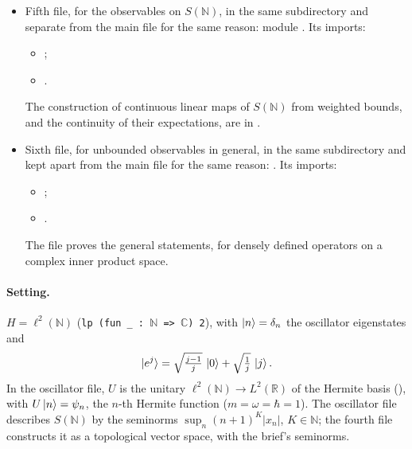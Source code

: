 \documentclass[11pt]{article}
\begin{document}
\begin{itemize}
\begin{itemize}
  \item {};
  \item {}.
  \end{itemize}
  The  file constructs $S(\mathbb{N})$ as a topological vector space.
\item Fifth file, for the observables on $S(\mathbb{N})$, in the same subdirectory and separate
  from the main file for the same reason: module .
  Its imports:
  \begin{itemize}
  \item {};
  \item {}.
  \end{itemize}
  The construction of continuous linear maps of $S(\mathbb{N})$ from weighted bounds, and the
  continuity of their expectations, are in .
\item Sixth file, for unbounded observables in general, in the same subdirectory and kept
  apart from the main file for the same reason:
  . Its imports:
  \begin{itemize}
  \item {};
  \item {}.
  \end{itemize}
  The  file proves the general statements, for densely defined operators on a
  complex inner product space.
\end{itemize}

\paragraph{Setting.} $H = \ell^2(\mathbb{N})$ (\texttt{lp (fun \_ : }$\mathbb{N}$\texttt{ => }$\mathbb{C}$\texttt{) 2}), with
$\ket{n} = \delta_n$ the oscillator eigenstates and
\[
  \ket{e^j} = \sqrt{\tfrac{j-1}{j}}\,\ket{0} + \sqrt{\tfrac{1}{j}}\,\ket{j}.
\]
In the oscillator file, $U$ is the unitary $\ell^2(\mathbb{N}) \to L^2(\mathbb{R})$ of the
Hermite basis (), with $U\ket{n} = \psi_n$, the $n$-th
Hermite function ($m = \omega = \hbar = 1$). The oscillator file describes $S(\mathbb{N})$ by the
seminorms $\sup_n (n+1)^K |x_n|$, $K \in \mathbb{N}$; the fourth file constructs it as a
topological vector space, with the brief's seminorms.
\end{document}
